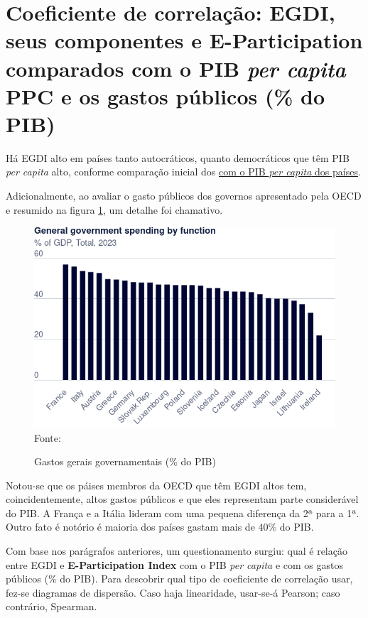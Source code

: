 \section{Coeficiente de correlação: EGDI, seus componentes e E-Participation comparados com o PIB \textit{per capita} PPC e os gastos públicos (\% do PIB)}

Há EGDI alto em países tanto autocráticos, quanto democráticos que têm PIB \textit{per capita} alto, conforme comparação inicial dos \href{https://data.worldbank.org/indicator/NY.GDP.PCAP.PP.KD}{com o PIB \textit{per capita} dos países}. 

Adicionalmente, ao avaliar o gasto públicos dos governos apresentado pela OECD e resumido na figura \ref{fig:government-spending-by-function}, um detalhe foi chamativo.

\begin{figure}[H]
	\centering
	\caption{Gastos gerais governamentais (\% do PIB)}
	\includegraphics[width=1\linewidth]{figuras/government_spending/government-spending-by-function}
	\label{fig:government-spending-by-function}
	\footnotesize{Fonte: \cite{global_gov_spending_function}}
\end{figure}

Notou-se que os páises membros da OECD que têm EGDI altos tem, coincidentemente, altos gastos públicos e que eles representam parte considerável do PIB. A França e a Itália lideram com uma pequena diferença da 2ª para a 1ª. Outro fato é notório é maioria dos países gastam mais de 40\% do PIB.

Com base nos parágrafos anteriores, um questionamento surgiu: qual é relação entre EGDI e \textbf{E-Participation Index} com o PIB \textit{per capita} e com os gastos públicos (\% do PIB). Para descobrir qual tipo de coeficiente de correlação usar, fez-se diagramas de dispersão. Caso haja linearidade, usar-se-á Pearson; caso contrário, Spearman.

